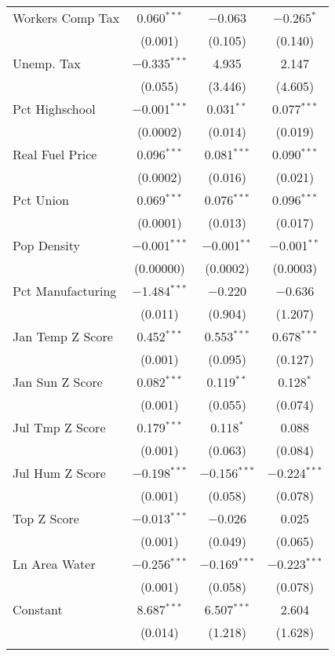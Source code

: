 \begin{table}[!htbp]
\begin{tabular}{@{\extracolsep{5pt}}lccc}
  Workers Comp Tax & 0.060$^{***}$ & $-$0.063 & $-$0.265$^{*}$ \\ 
  & (0.001) & (0.105) & (0.140) \\ 
  Unemp. Tax & $-$0.335$^{***}$ & 4.935 & 2.147 \\ 
  & (0.055) & (3.446) & (4.605) \\ 
  Pct Highschool & $-$0.001$^{***}$ & 0.031$^{**}$ & 0.077$^{***}$ \\ 
  & (0.0002) & (0.014) & (0.019) \\ 
  Real Fuel Price & 0.096$^{***}$ & 0.081$^{***}$ & 0.090$^{***}$ \\ 
  & (0.0002) & (0.016) & (0.021) \\ 
  Pct Union & 0.069$^{***}$ & 0.076$^{***}$ & 0.096$^{***}$ \\ 
  & (0.0001) & (0.013) & (0.017) \\ 
  Pop Density & $-$0.001$^{***}$ & $-$0.001$^{**}$ & $-$0.001$^{**}$ \\ 
  & (0.00000) & (0.0002) & (0.0003) \\ 
  Pct Manufacturing & $-$1.484$^{***}$ & $-$0.220 & $-$0.636 \\ 
  & (0.011) & (0.904) & (1.207) \\ 
  Jan Temp Z Score & 0.452$^{***}$ & 0.553$^{***}$ & 0.678$^{***}$ \\ 
  & (0.001) & (0.095) & (0.127) \\ 
  Jan Sun Z Score & 0.082$^{***}$ & 0.119$^{**}$ & 0.128$^{*}$ \\ 
  & (0.001) & (0.055) & (0.074) \\ 
  Jul Tmp Z Score & 0.179$^{***}$ & 0.118$^{*}$ & 0.088 \\ 
  & (0.001) & (0.063) & (0.084) \\ 
  Jul Hum Z Score & $-$0.198$^{***}$ & $-$0.156$^{***}$ & $-$0.224$^{***}$ \\ 
  & (0.001) & (0.058) & (0.078) \\ 
  Top Z Score & $-$0.013$^{***}$ & $-$0.026 & 0.025 \\ 
  & (0.001) & (0.049) & (0.065) \\ 
  Ln Area Water & $-$0.256$^{***}$ & $-$0.169$^{***}$ & $-$0.223$^{***}$ \\ 
  & (0.001) & (0.058) & (0.078) \\ 
  Constant & 8.687$^{***}$ & 6.507$^{***}$ & 2.604 \\ 
  & (0.014) & (1.218) & (1.628) \\ 
 \hline \\[-1.8ex] 

\end{tabular}
\end{table}
